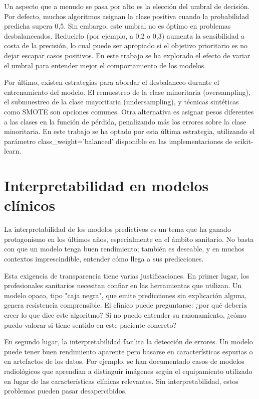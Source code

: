 \documentclass[12pt, a4paper, oneside]{report}
\begin{document}
Un aspecto que a menudo se pasa por alto es la elección del umbral de decisión. Por defecto, muchos algoritmos asignan la clase positiva cuando la probabilidad predicha supera 0,5. Sin embargo, este umbral no es óptimo en problemas desbalanceados. Reducirlo (por ejemplo, a 0,2 o 0,3) aumenta la sensibilidad a costa de la precisión, lo cual puede ser apropiado si el objetivo prioritario es no dejar escapar casos positivos. En este trabajo se ha explorado el efecto de variar el umbral para entender mejor el comportamiento de los modelos.

Por último, existen estrategias para abordar el desbalanceo durante el entrenamiento del modelo. El remuestreo de la clase minoritaria (oversampling), el submuestreo de la clase mayoritaria (undersampling), y técnicas sintéticas como SMOTE son opciones comunes. Otra alternativa es asignar pesos diferentes a las clases en la función de pérdida, penalizando más los errores sobre la clase minoritaria. En este trabajo se ha optado por esta última estrategia, utilizando el parámetro class\_weight='balanced' disponible en las implementaciones de scikit-learn.


\section{Interpretabilidad en modelos clínicos}

La interpretabilidad de los modelos predictivos es un tema que ha ganado protagonismo en los últimos años, especialmente en el ámbito sanitario. No basta con que un modelo tenga buen rendimiento; también es deseable, y en muchos contextos imprescindible, entender cómo llega a sus predicciones.

Esta exigencia de transparencia tiene varias justificaciones. En primer lugar, los profesionales sanitarios necesitan confiar en las herramientas que utilizan. Un modelo opaco, tipo "caja negra", que emite predicciones sin explicación alguna, genera resistencia comprensible. El clínico puede preguntarse: ¿por qué debería creer lo que dice este algoritmo? Si no puedo entender su razonamiento, ¿cómo puedo valorar si tiene sentido en este paciente concreto?

En segundo lugar, la interpretabilidad facilita la detección de errores. Un modelo puede tener buen rendimiento aparente pero basarse en características espurias o en artefactos de los datos. Por ejemplo, se han documentado casos de modelos radiológicos que aprendían a distinguir imágenes según el equipamiento utilizado en lugar de las características clínicas relevantes. Sin interpretabilidad, estos problemas pueden pasar desapercibidos.
\end{document}
